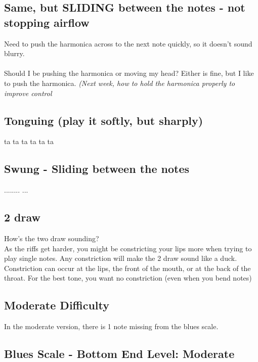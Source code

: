             \subsection*{Same, but SLIDING between the notes -  not stopping airflow}
                Need to push the harmonica across to the next note quickly, so it doesn't sound blurry. \\
                   \4\3\2\3\4   \\
                Should I be pushing the harmonica or moving my head? Either is fine, but I like to push the harmonica. \textit{(Next week, how to hold the harmonica properly to improve control}
                  
            \subsection*{Tonguing (play it softly, but sharply)}    
                \4\3\2\3\4          
                ta ta ta ta ta ta    
            
            \subsection*{Swung - Sliding between the notes}    
                \4...\3..\2.\3..\4 ...   
        
            \subsection*{2 draw}
                How's the two draw sounding?\\
                As the riffs get harder, you might be constricting your lips more when trying to play single notes. Any constriction will make the 2 draw sound like a duck. Constriction can occur at the lips, the front of the mouth, or at the back of the throat. For the best tone, you want no constriction (even when you bend notes) 

        
        
        \newpage
            \subsection*{Moderate Difficulty}
            In the moderate version, there is 1 note missing from the blues scale.
                \subsection*{Blues Scale - Bottom End \Downarrow Level: Moderate}
                    \4\four\3\2 \\
                
